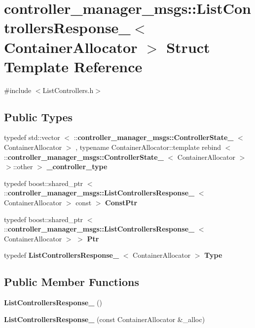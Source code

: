 \section{controller\-\_\-manager\-\_\-msgs\-:\-:\-List\-Controllers\-Response\-\_\-$<$ \-Container\-Allocator $>$ \-Struct \-Template \-Reference}
\label{structcontroller__manager__msgs_1_1ListControllersResponse__}


{\ttfamily \#include $<$\-List\-Controllers.\-h$>$}

\subsection*{\-Public \-Types}
\begin{DoxyCompactItemize}
\item 
typedef std\-::vector\*
$<$ \-::{\bf controller\-\_\-manager\-\_\-msgs\-::\-Controller\-State\-\_\-}\*
$<$ \-Container\-Allocator $>$\*
, typename \*
\-Container\-Allocator\-::template \*
rebind\*
$<$ \-::{\bf controller\-\_\-manager\-\_\-msgs\-::\-Controller\-State\-\_\-}\*
$<$ \-Container\-Allocator $>$\*
 $>$\-::other $>$ {\bf \-\_\-controller\-\_\-type}
\item 
typedef boost\-::shared\-\_\-ptr\*
$<$ \-::{\bf controller\-\_\-manager\-\_\-msgs\-::\-List\-Controllers\-Response\-\_\-}\*
$<$ \-Container\-Allocator $>$ const  $>$ {\bf \-Const\-Ptr}
\item 
typedef boost\-::shared\-\_\-ptr\*
$<$ \-::{\bf controller\-\_\-manager\-\_\-msgs\-::\-List\-Controllers\-Response\-\_\-}\*
$<$ \-Container\-Allocator $>$ $>$ {\bf \-Ptr}
\item 
typedef \*
{\bf \-List\-Controllers\-Response\-\_\-}\*
$<$ \-Container\-Allocator $>$ {\bf \-Type}
\end{DoxyCompactItemize}
\subsection*{\-Public \-Member \-Functions}
\begin{DoxyCompactItemize}
\item 
{\bf \-List\-Controllers\-Response\-\_\-} ()
\item 
{\bf \-List\-Controllers\-Response\-\_\-} (const \-Container\-Allocator \&\-\_\-alloc)
\end{DoxyCompactItemize}
